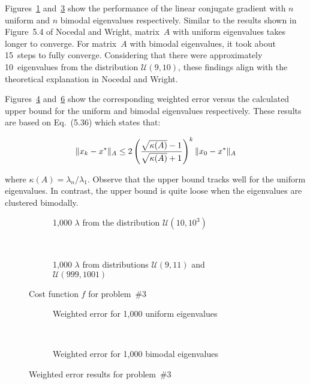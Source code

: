 Figures~\ref{fig:p03:uniformEigenvalues} and~\ref{fig:p03:bimodalEigenvalues} show the performance of the linear conjugate gradient with $n$ uniform and $n$ bimodal eigenvalues respectively.  Similar to the results shown in Figure~5.4 of Nocedal and Wright, matrix~$A$ with uniform eigenvalues takes longer to converge.  For matrix~$A$ with bimodal eigenvalues, it took about 15~steps to fully converge.  Considering that there were approximately 10~eigenvalues from the distribution $\mathcal{U}(9,10)$, these findings align with the theoretical explanation in Nocedal and Wright.

Figures~\ref{fig:p03:uniformWeightedErr} and~\ref{fig:p03:bimodalWeightedErr} show the corresponding weighted error versus the calculated upper bound for the uniform and bimodal eigenvalues respectively.  These results are based on Eq.~(5.36) which states that:

\[ \lVert x_k - x^{*}\rVert_{A} \leq 2\left(\frac{\sqrt{\kappa(A)}-1}{\sqrt{\kappa(A)}+1}\right)^{k}\lVert x_0 - x^{*}\rVert_{A} \]

\noindent
where $\kappa(A)=\lambda_n / \lambda_1$. Observe that the upper bound tracks well for the uniform eigenvalues.  In contrast, the upper bound is quite loose when the eigenvalues are clustered bimodally.

\newpage
\begin{figure}[p]
  \centering
  \begin{subfigure}[t]{0.45\textwidth}
    \centering
    
    \caption{\scriptsize 1,000 $\lambda$ from the distribution $\mathcal{U}(10,10^{3})$}\label{fig:p03:uniformEigenvalues}
  \end{subfigure}
  ~
  \begin{subfigure}[t]{0.45\textwidth}
    \centering
    
    \caption{\scriptsize 1,000 $\lambda$ from distributions $\mathcal{U}(9,11)$ and $\mathcal{U}(999,1001)$ }\label{fig:p03:bimodalEigenvalues}
  \end{subfigure}
  \caption{Cost function $f$ for problem~\#3}
\end{figure}

\begin{figure}[p]
  \centering
  \begin{subfigure}[t]{0.45\textwidth}
    \centering
    
    \caption{\scriptsize Weighted error for 1,000 uniform eigenvalues}\label{fig:p03:uniformWeightedErr}
  \end{subfigure}
  ~
  \begin{subfigure}[t]{0.45\textwidth}
    \centering
    
    \caption{\scriptsize Weighted error for 1,000 bimodal eigenvalues}\label{fig:p03:bimodalWeightedErr}
  \end{subfigure}
  \caption{Weighted error results for problem~\#3}
\end{figure}
\clearpage